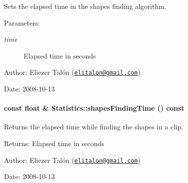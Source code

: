 Sets the elapsed time in the shapes finding algorithm. 

\begin{Desc}
\item[Parameters:]
\begin{description}
\item[{\em time}]Elapsed time in seconds\end{description}
\end{Desc}
\begin{Desc}
\item[Author:]Eliezer Talón (\href{mailto:elitalon@gmail.com}{\tt elitalon@gmail.com}) \end{Desc}
\begin{Desc}
\item[Date:]2008-10-13 \end{Desc}
\hypertarget{class_statistics_cdb8852bc99d12a619d130ae2e6948ee}{
\paragraph[{shapesFindingTime}]{\setlength{\rightskip}{0pt plus 5cm}const float \& Statistics::shapesFindingTime () const}\hfill}
\label{class_statistics_cdb8852bc99d12a619d130ae2e6948ee}


Returns the elapsed time while finding the shapes in a clip. 

\begin{Desc}
\item[Returns:]Elapsed time in seconds\end{Desc}
\begin{Desc}
\item[Author:]Eliezer Talón (\href{mailto:elitalon@gmail.com}{\tt elitalon@gmail.com}) \end{Desc}
\begin{Desc}
\item[Date:]2008-10-13 \end{Desc}


